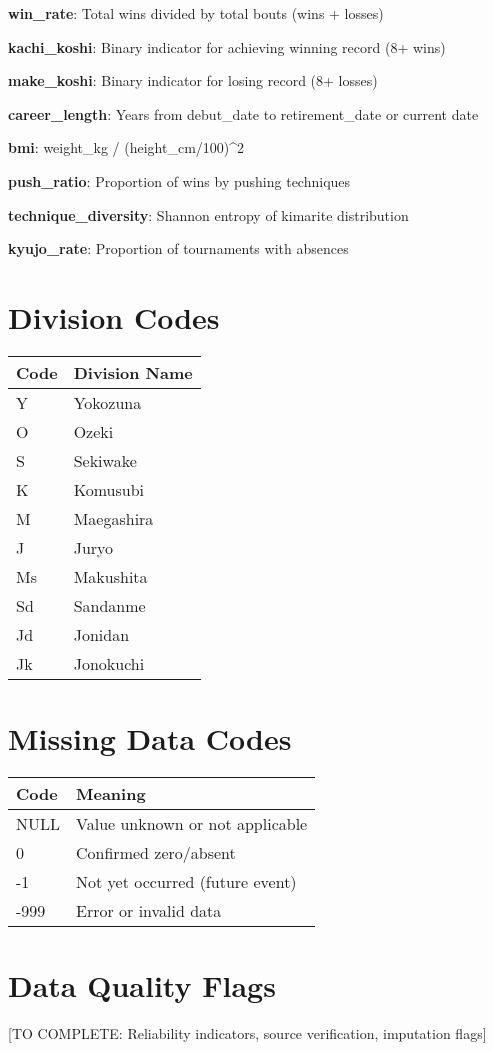 \textbf{win\_rate}: Total wins divided by total bouts (wins + losses)

\textbf{kachi\_koshi}: Binary indicator for achieving winning record (8+ wins)

\textbf{make\_koshi}: Binary indicator for losing record (8+ losses)

\textbf{career\_length}: Years from debut\_date to retirement\_date or current date

\textbf{bmi}: weight\_kg / (height\_cm/100)\^{}2

\textbf{push\_ratio}: Proportion of wins by pushing techniques

\textbf{technique\_diversity}: Shannon entropy of kimarite distribution

\textbf{kyujo\_rate}: Proportion of tournaments with absences

\section{Division Codes}

\begin{tabular}{ll}
\toprule
Code & Division Name \\
\midrule
Y & Yokozuna \\
O & Ozeki \\
S & Sekiwake \\
K & Komusubi \\
M & Maegashira \\
J & Juryo \\
Ms & Makushita \\
Sd & Sandanme \\
Jd & Jonidan \\
Jk & Jonokuchi \\
\bottomrule
\end{tabular}

\section{Missing Data Codes}

\begin{tabular}{ll}
\toprule
Code & Meaning \\
\midrule
NULL & Value unknown or not applicable \\
0 & Confirmed zero/absent \\
-1 & Not yet occurred (future event) \\
-999 & Error or invalid data \\
\bottomrule
\end{tabular}

\section{Data Quality Flags}

[TO COMPLETE: Reliability indicators, source verification, imputation flags]